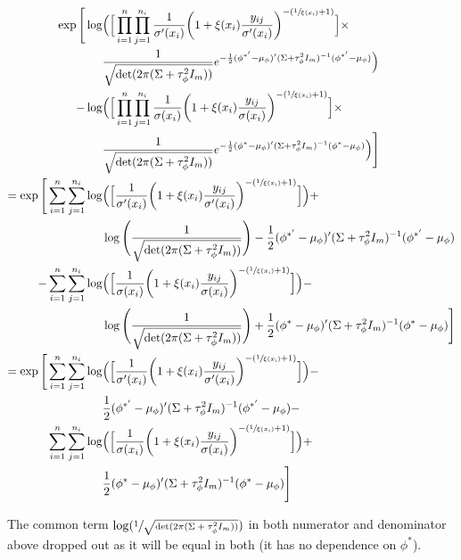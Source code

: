 \documentclass{article}
\begin{document}
\begin{align*}
 \exp \Bigg[ \log & \Big( \Big[ \prod_{i=1}^n \prod_{j=1}^{n_i} \frac{1}{\sigma'(x_i)} \bigg( 1 + \xi(x_i) \frac{y_{ij}}{\sigma'(x_i)} \bigg)^{-(\sfrac{1}{\xi(x_i)} + 1)} \Big] \times \\
& \frac{1}{\sqrt{\det(2 \pi (\Sigma + \tau^2_\phi I_m))}} e^{-\frac{1}{2} (\phi^{*'} - \mu_\phi)' (\Sigma + \tau^2_\phi I_m)^{-1} (\phi^{*'} - \mu_\phi) } \Big) \\
- \log & \Big( \Big[ \prod_{i=1}^n \prod_{j=1}^{n_i} \frac{1}{\sigma(x_i)} \bigg( 1 + \xi(x_i) \frac{y_{ij}}{\sigma(x_i)} \bigg)^{-(\sfrac{1}{\xi(x_i)} + 1)} \Big] \times \\
& \frac{1}{\sqrt{\det(2 \pi (\Sigma + \tau^2_\phi I_m))}} e^{-\frac{1}{2} (\phi^{*} - \mu_\phi)' (\Sigma + \tau^2_\phi I_m)^{-1} (\phi^{*} - \mu_\phi) } \Big) \Bigg] \\
= \exp \Bigg[ \sum_{i=1}^n \sum_{j=1}^{n_i} \log & \Big( \Big[ \frac{1}{\sigma'(x_i)} \bigg( 1 + \xi(x_i) \frac{y_{ij}}{\sigma'(x_i)} \bigg)^{-(\sfrac{1}{\xi(x_i)} + 1)} \Big] \Big) + \\
& \log \Bigg( \frac{1}{\sqrt{\det(2 \pi (\Sigma + \tau^2_\phi I_m))}} \Bigg) -\frac{1}{2} (\phi^{*'} - \mu_\phi)' (\Sigma + \tau^2_\phi I_m)^{-1} (\phi^{*'} - \mu_\phi) \\
- \sum_{i=1}^n \sum_{j=1}^{n_i} \log & \Big( \Big[  \frac{1}{\sigma(x_i)} \bigg( 1 + \xi(x_i) \frac{y_{ij}}{\sigma(x_i)} \bigg)^{-(\sfrac{1}{\xi(x_i)} + 1)} \Big] \Big) - \\
& \log \Bigg( \frac{1}{\sqrt{\det(2 \pi (\Sigma + \tau^2_\phi I_m))}} \Bigg) +\frac{1}{2} (\phi^{*} - \mu_\phi)' (\Sigma + \tau^2_\phi I_m)^{-1} (\phi^{*} - \mu_\phi) \Bigg] \\
= \exp \Bigg[ \sum_{i=1}^n \sum_{j=1}^{n_i} \log & \Big( \Big[ \frac{1}{\sigma'(x_i)} \bigg( 1 + \xi(x_i) \frac{y_{ij}}{\sigma'(x_i)} \bigg)^{-(\sfrac{1}{\xi(x_i)} + 1)} \Big] \Big) - \\
& \frac{1}{2} (\phi^{*'} - \mu_\phi)' (\Sigma + \tau^2_\phi I_m)^{-1} (\phi^{*'} - \mu_\phi) - \\
\sum_{i=1}^n \sum_{j=1}^{n_i} \log & \Big( \Big[  \frac{1}{\sigma(x_i)} \bigg( 1 + \xi(x_i) \frac{y_{ij}}{\sigma(x_i)} \bigg)^{-(\sfrac{1}{\xi(x_i)} + 1)} \Big] \Big) + \\
& \frac{1}{2} (\phi^{*} - \mu_\phi)' (\Sigma + \tau^2_\phi I_m)^{-1} (\phi^{*} - \mu_\phi) \Bigg]
\end{align*}

The common term $\log(\sfrac{1}{\sqrt{\det(2 \pi (\Sigma + \tau^2_\phi I_m))}})$ in both numerator and denominator above dropped out as it will be equal in both (it has no dependence on $\phi^*$). \\
\end{document}
